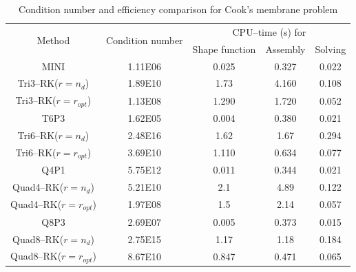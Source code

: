 \begin{table}[H]
\centering
\caption{Condition number and efficiency comparison for Cook's membrane problem}
\label{tab1}
\begin{tabular}{ccccc}
\toprule
\multirow{2}{*}{Method} & \multirow{2}{*}{Condition number} & \multicolumn{3}{c}{CPU--time (s) for} \\
\shortstack{} & \shortstack{} & Shape function & Assembly & Solving \\
\midrule
MINI & 1.11E06 & 0.025 & 0.327 & 0.022 \\
Tri3--RK($r=n_d$) & 1.89E10 & 1.73 & 4.160 & 0.108 \\
Tri3--RK($r=r_{opt}$) & 1.13E08 & 1.290 & 1.720 & 0.052 \\
T6P3 & 1.62E05 & 0.004 & 0.380 & 0.021 \\
Tri6--RK($r=n_d$) & 2.48E16 & 1.62 & 1.67 & 0.294 \\
Tri6--RK($r=r_{opt}$) & 3.69E10 & 1.110 & 0.634 & 0.077 \\
Q4P1 & 5.75E12 & 0.011 & 0.344 & 0.021 \\
Quad4--RK($r=n_d$) & 5.21E10 & 2.1 & 4.89 & 0.122 \\
Quad4--RK($r=r_{opt}$) & 1.97E08 & 1.5 & 2.14 & 0.057 \\
Q8P3 & 2.69E07 & 0.005 & 0.373 & 0.015 \\
Quad8--RK($r=n_d$) & 2.75E15 & 1.17 & 1.18 & 0.184 \\
Quad8--RK($r=r_{opt}$) & 8.67E10 & 0.847 & 0.471 & 0.065 \\
\bottomrule
\end{tabular}
\end{table}
